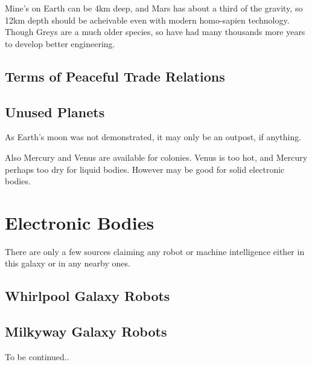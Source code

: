 \documentclass{report}
\begin{document}
Mine's on Earth can be 4km deep, and Mars has about a third of the gravity, so
12km depth should be acheivable even with modern homo-sapien technology. Though
Greys are a much older species, so have had many thousands more years to develop
better engineering.

\subsection{Terms of Peaceful Trade Relations}


\subsection{Unused Planets}

As Earth's moon was not demonstrated, it may only be an outpost, if anything.

Also Mercury and Venus are available for colonies. Venus is too hot, and Mercury
perhaps too dry for liquid bodies. However may be good for solid electronic
bodies. 



\section{Electronic Bodies}

There are only a few sources claiming any robot or machine intelligence either
in this galaxy or in any nearby ones.

\subsection{Whirlpool Galaxy Robots}

\subsection{Milkyway Galaxy Robots}


To be continued..

%
\end{document}
